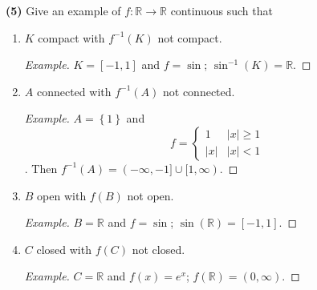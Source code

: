 \documentclass{article}
\newcommand{\R}{\mathbb{R}}
\newcommand{\abs}[1]{\left| #1 \right|}
\newcommand{\set}[1]{\left\{ #1 \right\}}
\begin{document}
\newpage %

\textbf{(5) }
Give an example of $f : \R \to \R$ continuous such that
\renewcommand{\labelenumi}{(\roman{enumi})}
\begin{enumerate}
    \item 
    $K$ compact with $f^{-1}(K)$ not compact.
    \begin{proof}[Example]
        $K = [-1, 1]$ and $f = \sin$; $\sin^{-1}(K) = \R$.
    \end{proof}


    \item 
    $A$ connected with $f^{-1}(A)$ not connected.
    \begin{proof}[Example]
        $A = \set{1}$ and
        $$f = \begin{cases}
            1 & \abs{x} \ge 1 \\
            \abs{x} & \abs{x} < 1
        \end{cases}$$. Then $f^{-1}(A) = (-\infty, -1] \cup [1, \infty)$.
        
    \end{proof}


    \item 
    $B$ open with $f(B)$ not open.
    \begin{proof}[Example]
        $B = \R$ and $f = \sin$; $\sin(\R) = [-1, 1]$.
    \end{proof}
    
    
    \item 
    $C$ closed with $f(C)$ not closed.
    \begin{proof}[Example]
        $C = \R$ and $f(x) = e^x$; $f(\R) = (0, \infty)$.
    \end{proof}
\end{enumerate}

\newpage %
\end{document}
